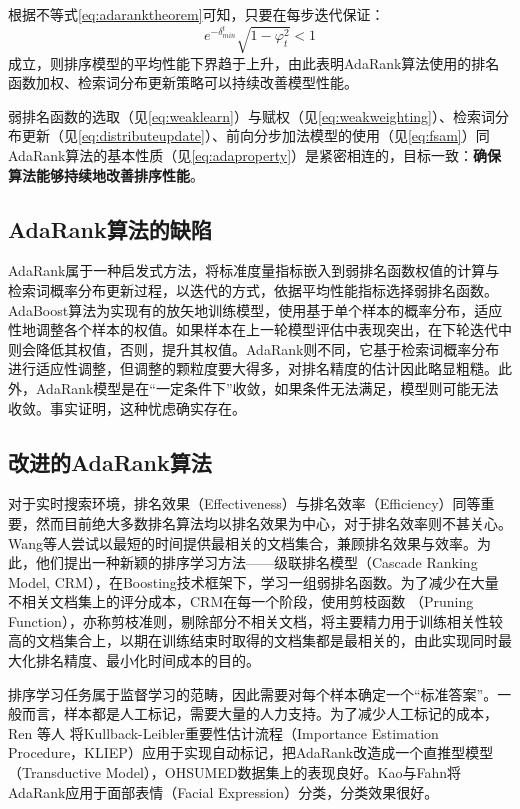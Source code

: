 根据不等式\eqref{eq:adaranktheorem}可知，只要在每步迭代保证：
\begin{equation}\label{eq:adaproperty}
    e^{-\delta_{min}^t} \sqrt{1-\varphi_t^2} < 1
\end{equation}
成立，则排序模型的平均性能下界趋于上升，由此表明AdaRank算法使用的排名函数加权、检索词分布更新策略可以持续改善模型性能。

弱排名函数的选取（见\eqref{eq:weaklearn}）与赋权（见\eqref{eq:weakweighting}）、检索词分布更新（见\eqref{eq:distributeupdate}）、前向分步加法模型的使用（见\eqref{eq:fsam}）同AdaRank算法的基本性质（见\eqref{eq:adaproperty}）是紧密相连的，目标一致：\textbf{确保算法能够持续地改善排序性能}。

\subsection{AdaRank算法的缺陷}
AdaRank属于一种启发式方法，将标准度量指标嵌入到弱排名函数权值的计算与检索词概率分布更新过程，以迭代的方式，依据平均性能指标选择弱排名函数。AdaBoost算法为实现有的放矢地训练模型，使用基于单个样本的概率分布，适应性地调整各个样本的权值。如果样本在上一轮模型评估中表现突出，在下轮迭代中则会降低其权值，否则，提升其权值。AdaRank则不同，它基于检索词概率分布进行适应性调整，但调整的颗粒度要大得多，对排名精度的估计因此略显粗糙。此外，AdaRank模型是在“一定条件下”收敛，如果条件无法满足，模型则可能无法收敛。事实证明，这种忧虑确实存在\cite{duh2008beyond,valizadegan2009learning}。

\subsection{改进的AdaRank算法}
对于实时搜索环境，排名效果（Effectiveness）与排名效率（Efficiency）同等重要，然而目前绝大多数排名算法均以排名效果为中心，对于排名效率则不甚关心。Wang等人\cite{wang2010learning,wang2011cascade}尝试以最短的时间提供最相关的文档集合，兼顾排名效果与效率。为此，他们提出一种新颖的排序学习方法——级联排名模型（Cascade Ranking Model, CRM），在Boosting技术框架下，学习一组弱排名函数。为了减少在大量不相关文档集上的评分成本，CRM在每一个阶段，使用剪枝函数
（Pruning Function），亦称剪枝准则，剔除部分不相关文档，将主要精力用于训练相关性较高的文档集合上，以期在训练结束时取得的文档集都是最相关的，由此实现同时最大化排名精度、最小化时间成本的目的。

排序学习任务属于监督学习的范畴，因此需要对每个样本确定一个“标准答案”。一般而言，样本都是人工标记，需要大量的人力支持。为了减少人工标记的成本，Ren 等人
\cite{ren2012importance}将Kullback-Leibler重要性估计流程（Importance Estimation Procedure，KLIEP）应用于实现自动标记，把AdaRank改造成一个直推型模型
（Transductive Model），OHSUMED数据集上的表现良好。Kao与Fahn\cite{kao2013machine}将AdaRank应用于面部表情（Facial Expression）分类，分类效果很好。

